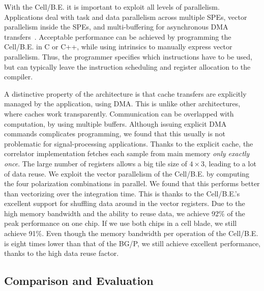 \documentclass{article}
\begin{document}
\noindent With the
\mbox{Cell/B.E.} it is important to exploit all levels of parallelism.
Applications deal with task and data parallelism across multiple SPEs,
vector parallelism inside the SPEs, and multi-buffering for
asynchronous DMA transfers~\cite{cell}.  Acceptable performance can be achieved by
programming the \mbox{Cell/B.E.}  in C or C++, while using intrinsics
to manually express vector parallelism.  Thus, the programmer
specifies which instructions have to be used, but can typically leave
the instruction scheduling and register allocation to the compiler.

A distinctive property of the architecture is that cache transfers are
explicitly managed by the application, using DMA. This is unlike other 
architectures, where caches work transparently.
Communication can be overlapped with computation, by using multiple buffers.
Although issuing explicit DMA commands complicates programming,
we found that this usually is not problematic for signal-processing applications.
Thanks to the explicit cache,
the correlator implementation fetches each sample from main memory
\emph{only exactly once}. 
The large number of registers allows a big tile size of 
$4\times3$, leading to a lot of data reuse.
We exploit the vector parallelism of the \mbox{Cell/B.E.} by computing the four
polarization combinations in parallel.  We found that this performs
better than vectorizing over the integration time.  This is thanks to the \mbox{Cell/B.E.}'s
excellent support for shuffling data around in the vector registers.
Due to the high
memory bandwidth and the ability to reuse data, we achieve 92\% of the peak
performance on one chip.  If we use both chips in a cell blade, we still achieve
91\%.  Even though the memory
bandwidth per operation of the \mbox{Cell/B.E.} is eight times lower than
that of the BG/P, we still achieve excellent performance, thanks to
the high data reuse factor.


\subsection{Comparison and Evaluation}
\label{sec:perf-compare}
\end{document}
